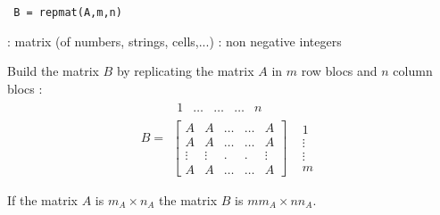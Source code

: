 
\begin{mandesc}
\end{mandesc}

\begin{calling_sequence}
\begin{verbatim}
 B = repmat(A,m,n)
\end{verbatim}
\end{calling_sequence}

\begin{parameters}
  \begin{varlist}
   : matrix (of numbers, strings, cells,...)
   : non negative integers
  \end{varlist}
\end{parameters}

\begin{mandescription}
  Build the matrix $B$ by replicating the matrix $A$ in $m$ row blocs and $n$ column blocs :
$$
 B=
     \begin{array}{cc}
             \begin{array}{ccccc} 1 & \hdots & \hdots & \hdots & n \end{array}  &          \\
      \left[ \begin{array}{ccccc} A     & A       & \hdots & \hdots & A     \\
                                     A     & A       & \hdots & \hdots & A     \\
                                    \vdots & \vdots  &   .    &    .    & \vdots\\
                                     A     & A       & \hdots & \hdots  & A 
                \end{array} \right] &
      \begin{array}{c} 1 \\ \vdots \\ \vdots \\ m \end{array}
     \end{array}
$$ 

If the matrix $A$ is $m_A \times n_A$ the matrix $B$ is  $ m m_A \times n n_A$.

\end{mandescription}

